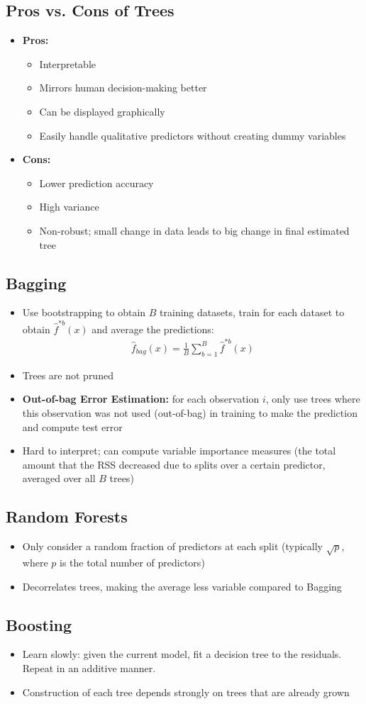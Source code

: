 \documentclass[10pt,a4paper]{article}
\begin{document}
\subsection{Pros vs. Cons of Trees}
\begin{itemize}
	\item \textbf{Pros:}
	\begin{itemize}
		\item Interpretable
		\item Mirrors human decision-making better
		\item Can be displayed graphically
		\item Easily handle qualitative predictors without creating dummy variables
	\end{itemize}
	\item \textbf{Cons:}
	\begin{itemize}
		\item Lower prediction accuracy
		\item High variance
		\item Non-robust; small change in data leads to big change in final estimated tree
	\end{itemize}
\end{itemize}

\subsection{Bagging}
\begin{itemize}
	\item Use bootstrapping to obtain $B$ training datasets, train for each dataset to obtain $\hat{f}^{*b}(x)$ and average the predictions:
	\begin{align*}
		\hat{f}_{bag}(x) = \frac{1}{B} \sum_{b=1}^B \hat{f}^{*b}(x)
	\end{align*}
	\item Trees are not pruned
	\item \textbf{Out-of-bag Error Estimation:} for each observation $i$, only use trees where this observation was not used (out-of-bag) in training to make the prediction and compute test error 
	\item Hard to interpret; can compute variable importance measures (the total amount that the RSS decreased due to splits over a certain predictor, averaged over all $B$ trees)
\end{itemize}

\subsection{Random Forests}
\begin{itemize}
	\item Only consider a random fraction of predictors at each split (typically $\sqrt{p}$, where $p$ is the total number of predictors)
	\item Decorrelates trees, making the average less variable compared to Bagging
\end{itemize}

\subsection{Boosting}
\begin{itemize}
	\item Learn slowly: given the current model, fit a decision tree to the residuals. Repeat in an additive manner.
	\item Construction of each tree depends strongly on trees that are already grown
\end{itemize}
\end{document}
